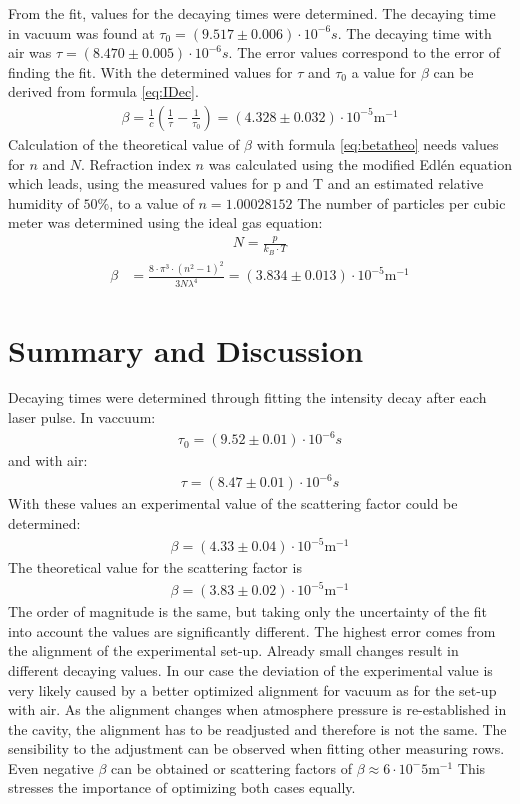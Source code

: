 \documentclass[
	parskip=half,10pt,
	numbers= noenddot, %
	toc=flat, %
	oneside,
	twocolumn,
	]{scrartcl}
\begin{document}
From the fit, values for the decaying times were determined. The decaying time in vacuum was found at $\tau_0=(9.517\pm0.006)\cdot 10^{-6}s$. The decaying time with air was $\tau=(8.470\pm0.005)\cdot 10^{-6}s$. The error values correspond to the error of finding the fit.
With the determined values for $\tau$ and $\tau_0$ a value for $\beta$ can be derived from formula \ref{eq:IDec}.
\begin{align}
\beta=\frac{1}{c}\left(\frac{1}{\tau}-\frac{1}{\tau_0}\right)=(4.328\pm0.032)\cdot 10^{-5}\si{\meter}^{-1}
\end{align}
Calculation of the theoretical value of $\beta$ with formula \ref{eq:betatheo} needs values for $n$ and $N$. Refraction index $n$ was calculated using the modified Edlén equation which leads, using the measured values for p and T and an estimated relative humidity of $50\%$, to a value of $n=1.00028152$\cite{edlen}
The number of particles per cubic meter was determined using the ideal gas equation:
\begin{align}
N=\frac{p}{k_B\cdot T}
\end{align}
\begin{align}
\beta &= \frac{8\cdot \pi^3\cdot (n^2-1)^2}{3 N \lambda^4}=(3.834\pm0.013)\cdot 10^{-5}\si{\meter}^{-1}
\end{align}
\section{Summary and Discussion}
Decaying times were determined through fitting the intensity decay after each laser pulse. 
In vaccuum:
\begin{align}
\tau_0=(9.52\pm0.01)\cdot 10^{-6}s
\end{align}
and with air:
\begin{align}
\tau=(8.47\pm0.01)\cdot 10^{-6}s
\end{align}
With these values an experimental value of the scattering factor could be determined: 
\begin{align}
\beta=(4.33\pm0.04)\cdot 10^{-5}\si{\meter}^{-1}
\end{align}
The theoretical value for the scattering factor is
\begin{align}
\beta=(3.83\pm0.02)\cdot 10^{-5}\si{\meter}^{-1}
\end{align}
The order of magnitude is the same, but taking only the uncertainty of the fit into account the values are significantly different.
The highest error comes from the alignment of the experimental set-up. Already small changes result in different decaying values. In our case the deviation of the experimental value is very likely caused by a better optimized alignment for vacuum as for the set-up with air. As the alignment changes when atmosphere pressure is re-established in the cavity, the alignment has to be readjusted and therefore is not the same.
The sensibility to the adjustment can be observed when fitting other measuring rows. Even negative $\beta$ can be obtained or scattering factors of $\beta\approx 6 \cdot 10^-5\si{\meter}^{-1}$
This stresses the importance of optimizing both cases equally.
\end{document}
